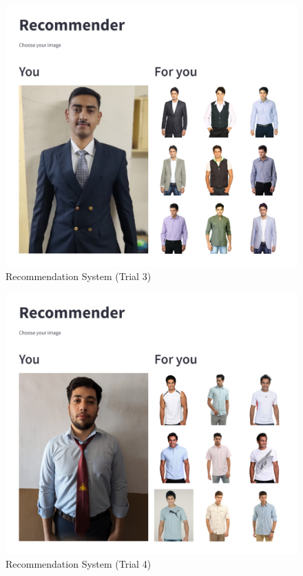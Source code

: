         \begin{figure}
            \centering
            \includegraphics[width=1\textwidth]{components/images/rec_3.jpg}
            \caption{Recommendation System (Trial 3)}
            \label{fig:recomm}
        \end{figure}
        \begin{figure}
            \centering
            \includegraphics[width=1\textwidth]{components/images/rec_4.jpg}
            \caption{Recommendation System (Trial 4)}
            \label{fig:recomm}
        \end{figure}


